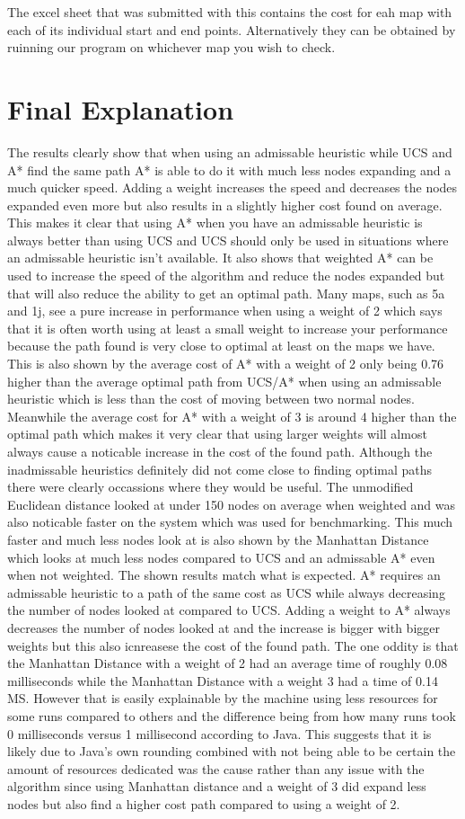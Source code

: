 \documentclass[11pt]{article} %
\begin{document}
The excel sheet that was submitted with this contains the cost for eah map with each of its individual start and end points. Alternatively they can be obtained by ruinning our program on whichever map you wish to check.



\section{Final Explanation}
The results clearly show that when using an admissable heuristic while UCS and A* find the same path A* is able to do it with much less nodes expanding and a much quicker speed. Adding a weight increases the speed and decreases the nodes expanded even more but also results in a slightly higher cost found on average. This makes it clear that using A* when you have an admissable heuristic is always better than using UCS and UCS should only be used in situations where an admissable heuristic isn't available. It also shows that weighted A* can be used to increase the speed of the algorithm and reduce the nodes expanded but that will also reduce the ability to get an optimal path. Many maps, such as 5a and 1j, see a pure increase in performance when using a weight of 2 which says that it is often worth using at least a small weight to increase your performance because the path found is very close to optimal at least on the maps we have. This is also shown by the average cost of A* with a weight of 2 only being 0.76 higher than the average optimal path from UCS/A* when using an admissable heuristic which is less than the cost of moving between two normal nodes. Meanwhile the average cost for A* with a weight of 3 is around 4 higher than the optimal path which makes it very clear that using larger weights will almost always cause a noticable increase in the cost of the found path. Although the inadmissable heuristics definitely did not come close to finding optimal paths there were clearly occassions where they would be useful. The unmodified Euclidean distance looked at under 150 nodes on average when weighted and was also noticable faster on the system which was used for benchmarking. This much faster and much less nodes look at is also shown by the Manhattan Distance which looks at much less nodes compared to UCS and an admissable A* even when not weighted. The shown results match what is expected. A* requires an admissable heuristic to a path of the same cost as UCS while always decreasing the number  of nodes looked at compared to UCS. Adding a weight to A* always decreases the number of nodes looked at and the increase is bigger with bigger weights but this also icnreasese the cost of the found path. The one oddity is that the Manhattan Distance with a weight of 2 had an average time of roughly 0.08 milliseconds while the Manhattan Distance with a weight 3 had a time of 0.14 MS. However that is easily explainable by the machine using less resources for some runs compared to others and the difference being from how many runs took 0 milliseconds versus 1 millisecond according to Java. This suggests that it is likely due to Java's own rounding combined with not being able to be certain the amount of resources dedicated was the cause rather than any issue with the algorithm since using Manhattan distance and a weight of 3 did expand less nodes but also find a higher cost path compared to using a weight of 2.
\end{document}
